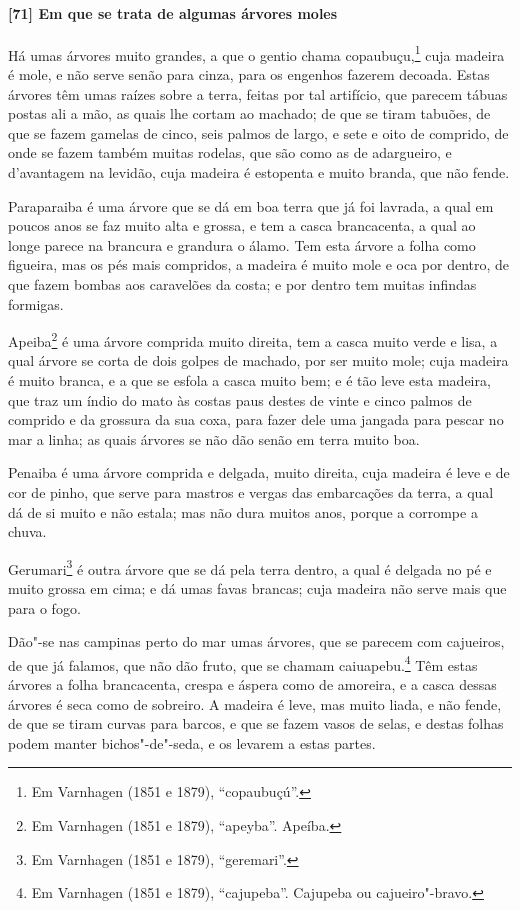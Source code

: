 \paragraph{[71] Em que se trata de algumas árvores moles}\quad
Há umas árvores muito grandes, a que o gentio chama copaubuçu,\footnote{ Em Varnhagen
(1851 e 1879), ``copaubuçú''.} cuja madeira é mole, e não serve senão para cinza, para os
engenhos fazerem decoada. Estas árvores têm umas raízes sobre a terra, feitas por tal
artifício, que parecem tábuas postas ali a mão, as quais lhe cortam ao machado; de que se
tiram tabuões, de que se fazem gamelas de cinco, seis palmos de largo, e sete e oito de
comprido, de onde se fazem também muitas rodelas, que são como as de adargueiro, e
d'avantagem na levidão, cuja madeira é estopenta e muito branda, que não fende.

Paraparaiba é uma árvore que se dá em boa terra que já foi lavrada, a qual em poucos anos
se faz muito alta e grossa, e tem a casca brancacenta, a qual ao longe parece na brancura
e grandura o álamo. Tem esta árvore a folha como figueira, mas os pés mais compridos, a
madeira é muito mole e oca por dentro, de que fazem bombas aos caravelões da costa; e por
dentro tem muitas infindas formigas.

Apeiba\footnote{ Em Varnhagen (1851 e 1879), ``apeyba''. Apeíba.} é uma árvore comprida
muito direita, tem a casca muito verde e lisa, a qual árvore se corta de dois golpes de
machado, por ser muito mole; cuja madeira é muito branca, e a que se esfola a casca muito
bem; e é tão leve esta madeira, que traz um índio do mato às costas paus destes de vinte e
cinco palmos de comprido e da grossura da sua coxa, para fazer dele uma jangada para
pescar no mar a linha; as quais árvores se não dão senão em terra muito boa.

Penaiba é uma árvore comprida e delgada, muito direita, cuja madeira é leve e de cor de
pinho, que serve para mastros e vergas das embarcações da terra, a qual dá de si muito e
não estala; mas não dura muitos anos, porque a corrompe a chuva.

Gerumari\footnote{ Em Varnhagen (1851 e 1879), ``geremari''.} é outra árvore que se dá
pela terra dentro, a qual é delgada no pé e muito grossa em cima; e dá umas favas brancas;
cuja madeira não serve mais que para o fogo.

Dão"-se nas campinas perto do mar umas árvores, que se parecem com cajueiros, de que já
falamos, que não dão fruto, que se chamam caiuapebu.\footnote{ Em Varnhagen (1851 e 1879),
``cajupeba''. Cajupeba ou cajueiro"-bravo.} Têm estas árvores a folha brancacenta, crespa e
áspera como de amoreira, e a casca dessas árvores é seca como de sobreiro. A madeira é
leve, mas muito liada, e não fende, de que se tiram curvas para barcos, e que se fazem
vasos de selas, e destas folhas podem manter bichos"-de"-seda, e os levarem a estas partes.

